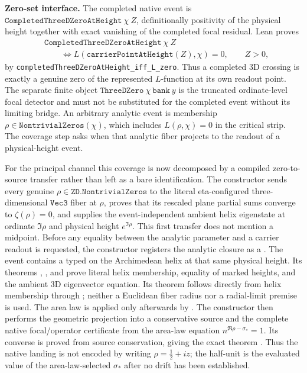 \medskip
\noindent\textbf{Zero-set interface.}  The completed native event is
\(\texttt{CompletedThreeDZeroAtHeight}\ \chi\ Z\), definitionally positivity
of the physical height together with exact vanishing of the completed focal
residual.  Lean proves
\[
\begin{split}
 &\texttt{CompletedThreeDZeroAtHeight}\ \chi\ Z\\
 &\qquad\Longleftrightarrow
 L\!\left(\texttt{carrierPointAtHeight}(Z),\chi\right)=0,
 \qquad Z>0,
\end{split}
\]
by \texttt{completedThreeDZeroAtHeight\_iff\_L\_zero}.  Thus a completed 3D
crossing is exactly a genuine zero of the represented $L$-function at its
own readout point.  The separate finite object
\(\texttt{ThreeDZero}\ \chi\ \texttt{bank}\ y\) is the truncated
ordinate-level focal detector and must not be substituted for the completed
event without its limiting bridge.  An arbitrary analytic event is membership
\(\rho\in\texttt{NontrivialZeros}(\chi)\), which includes
\(L(\rho,\chi)=0\) in the critical strip.  The coverage step asks when that
analytic fiber projects to the readout of a physical-height event.

For the principal channel this coverage is now decomposed by a compiled
zero-to-source transfer rather than left as a bare identification.  The
constructor  sends every genuine
\(\rho\in\texttt{ZD.NontrivialZeros}\) to the literal eta-configured
three-dimensional \(\texttt{Vec3}\) fiber at \(\rho\), proves that its
rescaled plane partial sums converge to \(\zeta(\rho)=0\), and supplies the
event-independent ambient helix eigenstate at ordinate \(\Im\rho\) and
physical height \(e^{\Im\rho}\).  This first transfer does not mention a
midpoint.  Before any equality between the analytic parameter and a carrier
readout is requested, the constructor
 registers the analytic
closure as a .  The event contains a
typed  on the Archimedean helix at that same physical
height.  Its theorems ,
, and  prove
literal helix membership, equality of marked heights, and the ambient 3D
eigenvector equation.  Its  theorem follows directly
from helix membership through
; neither a Euclidean fiber radius
nor a radial-limit premise is used.  The area law is applied only afterwards
by .  The constructor
 then performs
the geometric projection into a conservative source and the complete native
focal/operator certificate from the area-law equation
\(n^{\Re\rho-\sigma_*}=1\).  Its converse is proved from source conservation,
giving the exact theorem
.
Thus the native landing is not encoded by writing
\(\rho=\tfrac12+i z\); the half-unit is the evaluated value of the
area-law-selected \(\sigma_*\) after no drift has been established.


